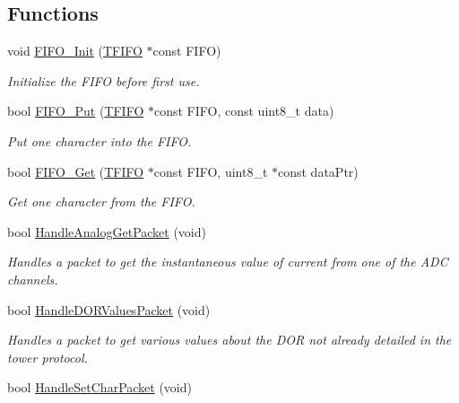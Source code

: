 \subsection*{Functions}
\begin{DoxyCompactItemize}
\item 
void \hyperlink{group__main__module_gad9207f49ab9ed061b6dca6063112ca60}{F\+I\+F\+O\+\_\+\+Init} (\hyperlink{struct_t_f_i_f_o}{T\+F\+I\+F\+O} $\ast$const F\+I\+F\+O)
\begin{DoxyCompactList}\small\item\em Initialize the F\+I\+F\+O before first use. \end{DoxyCompactList}\item 
bool \hyperlink{group__main__module_gace64ba4e6bd943f990a294693156cc3b}{F\+I\+F\+O\+\_\+\+Put} (\hyperlink{struct_t_f_i_f_o}{T\+F\+I\+F\+O} $\ast$const F\+I\+F\+O, const uint8\+\_\+t data)
\begin{DoxyCompactList}\small\item\em Put one character into the F\+I\+F\+O. \end{DoxyCompactList}\item 
bool \hyperlink{group__main__module_ga6407e3daf24a826a7f17d3e48865e89a}{F\+I\+F\+O\+\_\+\+Get} (\hyperlink{struct_t_f_i_f_o}{T\+F\+I\+F\+O} $\ast$const F\+I\+F\+O, uint8\+\_\+t $\ast$const data\+Ptr)
\begin{DoxyCompactList}\small\item\em Get one character from the F\+I\+F\+O. \end{DoxyCompactList}\item 
bool \hyperlink{group__main__module_gac30606b79413b487e73dac23f591be4a}{Handle\+Analog\+Get\+Packet} (void)
\begin{DoxyCompactList}\small\item\em Handles a packet to get the instantaneous value of current from one of the A\+D\+C channels. \end{DoxyCompactList}\item 
bool \hyperlink{group__main__module_ga75733e9ade3cc030a8981653259f0136}{Handle\+D\+O\+R\+Values\+Packet} (void)
\begin{DoxyCompactList}\small\item\em Handles a packet to get various values about the D\+O\+R not already detailed in the tower protocol. \end{DoxyCompactList}\item 
bool \hyperlink{group__main__module_ga252d4f3523c9e44b9c404c9682331ecc}{Handle\+Set\+Char\+Packet} (void)

\end{DoxyCompactItemize}
